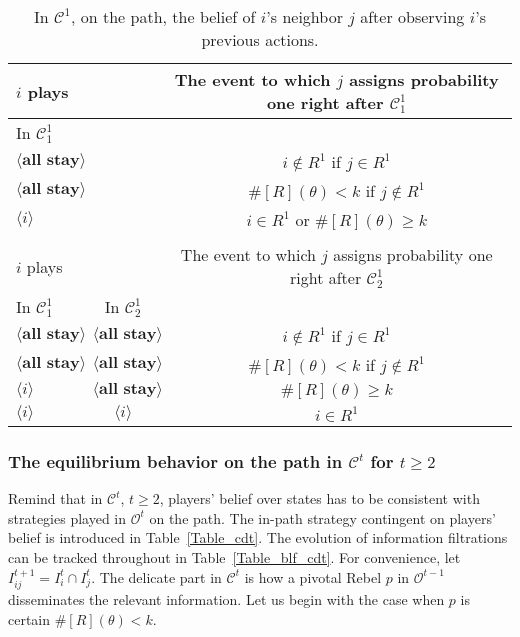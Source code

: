 \documentclass[12pt,letter]{article}
\newcommand{\Kappa}{\mathcal{C}}
\newcommand{\Omicron}{\mathcal{O}}
\theoremstyle{definition}
\theoremstyle{remark}
\theoremstyle{claim}
\begin{document}
\begin{table}[!htbp]
\caption{In $\Kappa^1$, on the path, the belief of $i$'s neighbor $j$ after observing $i$'s previous actions.}
\label{Table_blf_cd0}
\begin{center}
\begin{tabular}{l  c | c}
 	$i$ plays	  			&	  &  The event to which $j$ assigns probability one  right after $\Kappa^1_{1}$\\
\hline
\hline
In $\Kappa^1_{1}$	&		&		  \\
\hline
  $\langle \textbf{all stay} \rangle$	& &   $i\notin R^1$ if $j\in R^1$ \\
  $\langle \textbf{all stay} \rangle$	&  &  $\#[R](\theta)< k$ if $j\notin R^1$\\
  $\langle i \rangle$	&	&  $i\in R^1$ or $\#[R](\theta)\geq k$    \\
  \hline
  \\
 	$i$ plays	  	&  	  &The event to which $j$ assigns probability one  right after $\Kappa^1_{2}$\\
\hline
\hline
	In $\Kappa^1_{1}$		&			In $\Kappa^1_{2}$	&  \\
\hline
  $\langle \textbf{all stay} \rangle$	&  $\langle \textbf{all stay} \rangle$ &  $i\notin R^1$ if $j\in R^1$ \\
  $\langle \textbf{all stay} \rangle$	&  $\langle \textbf{all stay} \rangle$ &  $\#[R](\theta)< k$ if $j\notin R^1$\\
  $\langle i \rangle$	&	$\langle \textbf{all stay} \rangle$ &  $\#[R](\theta)\geq k$    \\
  $\langle i \rangle$	&	$\langle i \rangle$ &  $i\in R^1$  \\
  \hline
\end{tabular}
\end{center}
\end{table}




\subsubsection{The equilibrium behavior on the path in $\Kappa^t$ for $t\geq 2$}
Remind that in $\Kappa^t$, $t\geq 2$, players' belief over states has to be consistent with strategies played in $\Omicron^t$ on the path. The in-path strategy contingent on players' belief is introduced in Table~\ref{Table_cdt}. The evolution of information filtrations can be tracked throughout in Table~\ref{Table_blf_cdt}.  For convenience, let $I^{t+1}_{ij}=I^t_i\cap I^t_j$. The delicate part in $\Kappa^t$ is how a pivotal Rebel $p$ in $\Omicron^{t-1}$ disseminates the relevant information. Let us begin with the case when $p$ is certain $\#[R](\theta)< k$.
\end{document}
